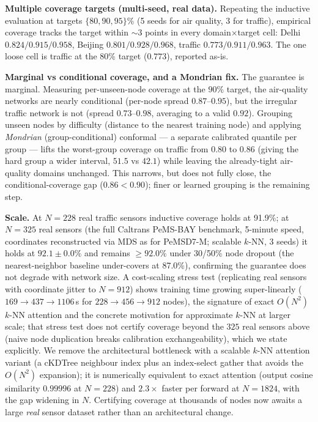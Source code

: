 \documentclass[journal]{IEEEtran}
\begin{document}
\textbf{Multiple coverage targets (multi-seed, real data).} Repeating the inductive evaluation at
targets $\{80, 90, 95\}\%$ (5 seeds for air quality, 3 for traffic),
empirical coverage tracks the target within $\sim3$ points in every domain$\times$target cell: Delhi
$0.824/0.915/0.958$, Beijing $0.801/0.928/0.968$, traffic $0.773/0.911/0.963$. The one loose cell is
traffic at the $80\%$ target ($0.773$), reported as-is.

\textbf{Marginal vs conditional coverage, and a Mondrian fix.} The guarantee is marginal. Measuring
per-unseen-node coverage at the $90\%$ target, the air-quality networks are nearly conditional
(per-node spread $0.87$--$0.95$), but the irregular traffic network is not (spread $0.73$--$0.98$,
averaging to a valid $0.92$). Grouping unseen nodes by difficulty (distance to the nearest training
node) and applying \emph{Mondrian} (group-conditional) conformal --- a separate calibrated quantile
per group --- lifts the worst-group coverage on traffic from $0.80$ to $0.86$ (giving the hard group a
wider interval, $51.5$ vs $42.1$) while leaving the already-tight air-quality domains unchanged. This
narrows, but does not fully close, the conditional-coverage gap ($0.86 < 0.90$); finer or learned
grouping is the remaining step.

\textbf{Scale.} At $N{=}228$ real traffic sensors inductive coverage holds at 91.9\%; at
\textbf{$N{=}325$} real sensors (the full Caltrans PeMS-BAY benchmark, 5-minute speed, coordinates
reconstructed via MDS as for PeMSD7-M; scalable $k$-NN, 3 seeds) it holds at
\textbf{$92.1\pm0.0\%$} and remains $\ge 92.0\%$ under 30/50\% node dropout (the nearest-neighbor
baseline under-covers at 87.0\%), confirming the guarantee does not degrade with network size. A cost-scaling stress test (replicating real sensors with coordinate
jitter to $N{=}912$) shows training time growing super-linearly ($169\to437\to1106$\,s for
$228\to456\to912$ nodes), the signature of exact $O(N^2)$ $k$-NN attention and the concrete
motivation for approximate $k$-NN at larger scale; that stress test does not certify coverage beyond
the $325$ real sensors above (naive node duplication breaks calibration exchangeability), which we
state explicitly. We remove the architectural bottleneck with a scalable $k$-NN attention variant (a
cKDTree neighbour index plus an index-select gather that avoids the $O(N^2)$ expansion); it is
numerically equivalent to exact attention (output cosine similarity $0.99996$ at $N{=}228$) and
$2.3\times$ faster per forward at $N{=}1824$, with the gap widening in $N$. Certifying coverage at
thousands of nodes now awaits a large \emph{real} sensor dataset rather than an architectural change.
\end{document}
